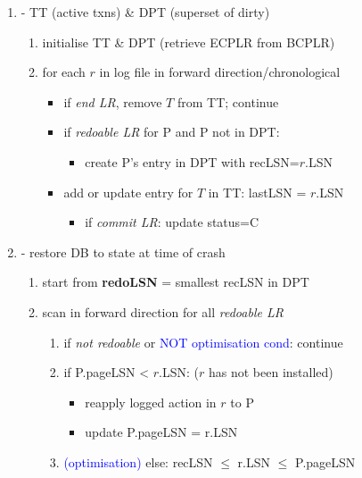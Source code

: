 \documentclass[10pt, landscape]{article}
\begin{document}
\begin{multicols*}{4}
  \begin{enumerate}
    \item {} - TT (active txns) \& DPT (superset of dirty)
      \begin{enumerate}
        \item initialise TT \& DPT (retrieve ECPLR from BCPLR)
        \item for each $r$ in log file in forward direction/chronological
          \begin{itemize}
            \item if \textit{end LR}, remove $T$ from TT; continue
            \item if \textit{redoable LR} for P and P not in DPT:
              \begin{itemize}
                \item create P's entry in DPT with recLSN=$r$.LSN
              \end{itemize}
            \item add or update entry for $T$ in TT: lastLSN = $r$.LSN
              \begin{itemize}
                \item if \textit{commit LR}: update status=C
              \end{itemize}
          \end{itemize}
      \end{enumerate}
    \item {} - restore DB to state at time of crash
      \begin{enumerate}
        \item start from \textbf{redoLSN} = smallest recLSN in DPT
        \item scan in forward direction for all \textit{redoable LR}
          \begin{enumerate}
            \item if \textit{not redoable} or \textcolor{blue}{NOT optimisation cond}: continue
            \item if P.pageLSN < $r$.LSN: ($r$ has not been installed)
              \begin{itemize}
                \item reapply logged action in $r$ to P
                \item update P.pageLSN = r.LSN
              \end{itemize}
            \item \textcolor{blue}{(optimisation)} else: recLSN $\leq$ r.LSN $\leq$ P.pageLSN

\end{enumerate}
\end{enumerate}
\end{enumerate}
\end{multicols*}
\end{document}
